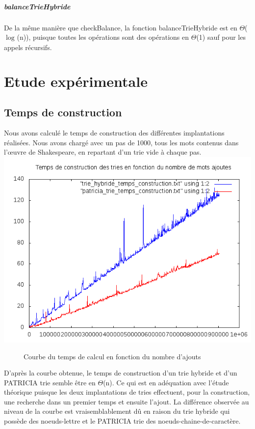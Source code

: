 \documentclass[a4paper,12pt]{report}
\begin{document}
\paragraph{balanceTrieHybride}
De la même manière que checkBalance, la fonction balanceTrieHybride est en $\Theta$($\log_{}$(n)), puisque toutes les opérations
sont des opérations en $\Theta$(1) sauf pour les appels récursifs.

\chapter{Etude expérimentale}
\section{Temps de construction}
Nous avons calculé le temps de construction des différentes implantations réalisées. Nous avons chargé avec un pas de 1000,
tous les mots contenus dans l’œuvre de Shakespeare, en repartant d'un trie vide à chaque pas.\\
\includegraphics{../comparaison/courbe_temps_construction.png}
\begin{figure}[!htbp]
\caption{Courbe du temps de calcul en fonction du nombre d'ajouts}
\end{figure}

D'après la courbe obtenue, le temps de construction d'un trie hybride et d'un PATRICIA trie semble être en $\Theta$(n).
Ce qui est en adéquation avec l'étude théorique puisque les deux implantations de tries effectuent, pour la construction,
une recherche dans un premier temps et ensuite l'ajout.
La différence observée au niveau de la courbe est vraisemblablement dû en raison du trie hybride qui possède des noeuds-lettre
et le PATRICIA trie des noeuds-chaine-de-caractère.
\end{document}
